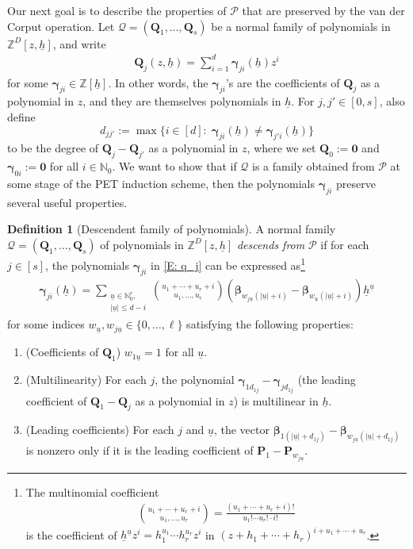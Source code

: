 \documentclass[11pt]{amsart}
\theoremstyle{definition}
\newtheorem{definition}[lemma]{Definition}
\newcommand{\N}{{\mathbb N}}
\newcommand{\Z}{{\mathbb Z}}
\newcommand{\CP}{{\mathcal P}}
\newcommand{\CQ}{{\mathcal Q}}
\newcommand{\bp}{{\textbf{P}}}
\newcommand{\bq}{{\textbf{Q}}}
\newcommand{\q}{{\textbf{Q}}}
\newcommand{\bgamma}{{\boldsymbol{\gamma}}}
\newcommand{\bbeta}{{\boldsymbol{\beta}}}
\newcommand{\uh}{{\underline{h}}}
\newcommand{\uu}{{\underline{u}}}
\begin{document}
      Our next goal is to describe the properties of $\CP$ that are preserved by the van der Corput operation. Let $\CQ = (\q_1, \ldots, \q_{s})$ be a normal family of polynomials in $\Z^D[z, \uh]$, and write 
      \begin{align}\label{E: q_j}
        \bq_j(z,\uh) = \sum_{i=1}^d \bgamma_{ji}(\uh)z^i      
      \end{align}
     for some $\bgamma_{ji}\in\Z[\uh]$. In other words, the $\bgamma_{ji}$'s are the coefficients of $\bq_j$ as a polynomial in $z$, and they are themselves polynomials in $\uh$. For $j,j'\in[0,s]$, also define
      $$d_{jj'} := \max\{i\in[d]:\; \bgamma_{ji}(\uh)\neq \bgamma_{j'i}(\uh)\}$$
      to be the degree of $\q_j - \q_{j'}$ as a polynomial in $z$,
      where we set $\bq_0 := \mathbf{0}$ and $\bgamma_{0i}:=\mathbf{0}$ for all $i\in\N_0$.
      We want to show that if $\CQ$ is a family obtained from $\CP$ at some stage of the PET induction scheme, then the polynomials $\bgamma_{ji}$ preserve several useful properties.
      \begin{definition}[Descendent family of polynomials]\label{D: descendence}
      A {normal} family $\CQ = (\q_1, \ldots, \q_{s})$ of polynomials in $\Z^D[z, \uh]$ \textit{descends from} $\CP$ if for each $j\in[s]$, the polynomials $\bgamma_{ji}$ in \eqref{E: q_j} can be expressed as\footnote{The multinomial coefficient
      \begin{align*}
          {{{u_1+\cdots + u_r+i}\choose{u_1, \ldots, u_r}}} = \frac{(u_1+\cdots+u_r+i)!}{u_1!\cdots u_r!\cdot i!}
      \end{align*}
      is the coefficient of $\uh^{\uu}z^i = h_1^{u_1}\cdots h_r^{u_r} z^i$ in $(z+h_1+\cdots + h_r)^{i+u_1+\cdots+u_r}$.}
          \begin{align}\label{E: gamma_ji}
              \bgamma_{ji}(\uh) =  \sum_{\substack{\uu\in \N_0^{r},\\ |\uu|\leq d-i}} {{{u_1+\cdots + u_r+i}\choose{u_1, \ldots, u_r}}}(\bbeta_{w_{j\uu}(|\uu|+i)}-\bbeta_{w_{\uu}(|\uu|+i)})\uh^\uu
          \end{align}
        for some indices $w_{\uu}, w_{j\uu}\in\{0, \ldots, \ell\}$ satisfying the following properties:
      \begin{enumerate}
          \item\label{i: w_1} (Coefficients of $\q_1$) $w_{1\uu} = 1$ for all $\uu$.
          \item\label{i: multilinear} (Multilinearity) For each $j$, the polynomial $\bgamma_{1d_{1j}}-\bgamma_{jd_{1j}}$ (the leading coefficient of $\bq_1 - \bq_{j}$ as a polynomial in $z$) is multilinear in $\uh$.  
        \item\label{i: leading coeffs} (Leading coefficients) For each $j$ and $\uu$, the vector $\bbeta_{1(|\uu|+d_{1j})}-\bbeta_{w_{j\uu}(|\uu|+d_{1j})}$ is nonzero only if it is the leading coefficient of  $\bp_1-\bp_{w_{j\uu}}$.
      \end{enumerate}
      \end{definition}
\end{document}
